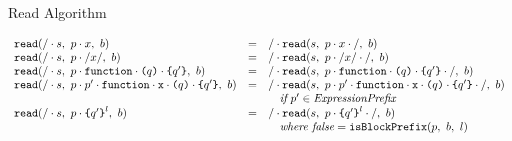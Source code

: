 \documentclass[preprint,10pt]{sigplanconf}
\begin{document}
\begin{displayfigure*}{\label{fig:read}Read Algorithm}
  
\[
  \begin{array}{lcll}
    \texttt{read}(/\cdot s,~p\cdot x,~b)
    &=&
    / \cdot 
      \texttt{read}(s,~
        p\cdot x\cdot /
      ,~b)
   
    \\
    \texttt{read}(/\cdot s,~p \cdot /x/,~b)
    &=&
    / \cdot 
      \texttt{read}(s,~
        p \cdot /x/ \cdot /
      ,~b)
   
    \\
    \texttt{read}(/\cdot s,~p \cdot \texttt{function}\cdot \texttt{(}q\texttt{)}
      \cdot \texttt{\{}q'\texttt{\}},~b)
    &=&
    / \cdot 
      \texttt{read}(s,~
        p \cdot \texttt{function}\cdot \texttt{(}q\texttt{)}
        \cdot \texttt{\{}q'\texttt{\}} \cdot /
      ,~b)
   
    \\
    \texttt{read}(/\cdot s,~
      p \cdot p' \cdot \texttt{function}\cdot \texttt{x} 
      \cdot \texttt{(}q\texttt{)} \cdot \texttt{\{}q'\texttt{\}}
    ,~b)
    &=&
    / \cdot 
      \texttt{read}(s,~
        p \cdot p' \cdot \texttt{function}\cdot \texttt{x} \cdot \texttt{(}q\texttt{)}
        \cdot \texttt{\{}q'\texttt{\}} \cdot /
      ,~b)
   
    \\
    && \quad \textit{if}~p' \in \textit{ExpressionPrefix}
    \\
    \texttt{read}(/\cdot s,~
      p \cdot \texttt{\{}q'\texttt{\}}^{l}
    ,~b)
    &=&
    / \cdot 
      \texttt{read}(s,~
        p \cdot \texttt{\{}q'\texttt{\}}^{l} \cdot /
      ,~b)
   
    \\
    && \quad \textit{where false} = \texttt{isBlockPrefix}(p,~b,~l)


\end{array}\]
\end{displayfigure*}
\end{document}
